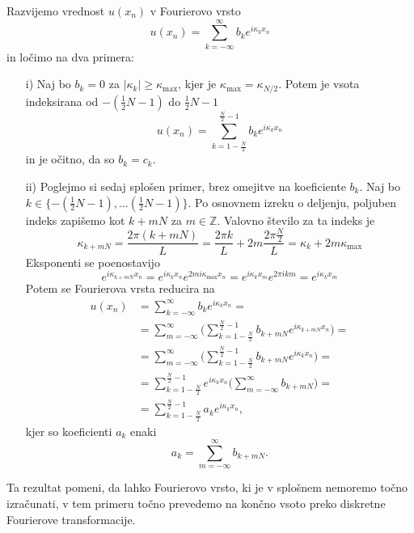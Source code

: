\documentclass[mat2, tisk]{fmfdelo}
\newcommand{\Z}{\mathbb Z}
\begin{document}
\begin{dokaz}
Razvijemo vrednost $u(x_n)$ v Fourierovo vrsto 
$$
u(x_n) = \sum_{k=-\infty}^{\infty} b_k e^{i\kappa_k x_n}
$$
in ločimo na dva primera: \\
\begin{enumerate}
  \item[i)] Naj bo $b_k = 0$ za $|\kappa_k| \geq \kappa_{\text{max}}$, kjer je 
  $\kappa_{\text{max}} = \kappa_{N/2}$. Potem je vsota indeksirana od 
  $-(\frac{1}{2}N - 1)$ do $\frac{1}{2}N - 1$
  $$
  u(x_n) = \sum_{k=1-\frac{N}{2}}^{\frac{N}{2}-1} b_k e^{i\kappa_k x_n}
  $$
  in je očitno, da so $b_k = c_k$. 
  \item[ii)] Poglejmo si sedaj splošen primer, brez omejitve na koeficiente 
  $b_k$. Naj bo $k \in \{-(\frac{1}{2}N - 1), \dots (\frac{1}{2}N - 1)\}$. 
  Po osnovnem izreku o deljenju, poljuben indeks zapišemo kot
  $k + mN$ za $m\in \Z$. Valovno število za ta indeks je 
  $$
  \kappa_{k + mN} = \frac{2\pi (k + mN)}{L} = \frac{2\pi k}{L} + 2m\frac{2\pi \frac{N}{2}}{L} = \kappa_k + 2m \kappa_{\text{max}}
  $$
  Eksponenti se poenostavijo 
  $$
  e^{i \kappa_{k + mN} x_n} =  e^{i \kappa_{k} x_n}  e^{2mi\kappa_{\text{max}} x_n} = 
  e^{i\kappa_k x_m} e^{2\pi i k m} = e^{i\kappa_k x_m}
  $$
  Potem se Fourierova vrsta reducira na 
  \begin{align*}
  u(x_n) &= \sum_{k=-\infty}^{\infty} b_k e^{i\kappa_k x_n} = \\
         &= \sum_{m=-\infty}^{\infty} \Big(\sum_{k=1-\frac{N}{2}}^{\frac{N}{2}-1} b_{k+mN} e^{i\kappa_{k+mN} x_n}\Big) =\\ 
         &= \sum_{m=-\infty}^{\infty} \Big(\sum_{k=1-\frac{N}{2}}^{\frac{N}{2}-1} b_{k+mN} e^{i\kappa_{k} x_n}\Big) =\\ 
         &= \sum_{k=1-\frac{N}{2}}^{\frac{N}{2}-1} e^{i\kappa_{k} x_n}\Big(\sum_{m=-\infty}^{\infty} b_{k+mN}\Big) =\\
         &= \sum_{k=1-\frac{N}{2}}^{\frac{N}{2}-1} a_k e^{i\kappa_{k} x_n},
\end{align*}
kjer so koeficienti $a_k$ enaki 
$$a_k = \sum_{m=-\infty}^{\infty} b_{k+mN}.$$
\end{enumerate}
\end{dokaz}

Ta rezultat pomeni, da lahko Fourierovo vrsto, ki je v splošnem nemoremo 
točno izračunati, v tem primeru točno prevedemo na končno vsoto preko 
diskretne Fourierove transformacije. \\
\end{document}
